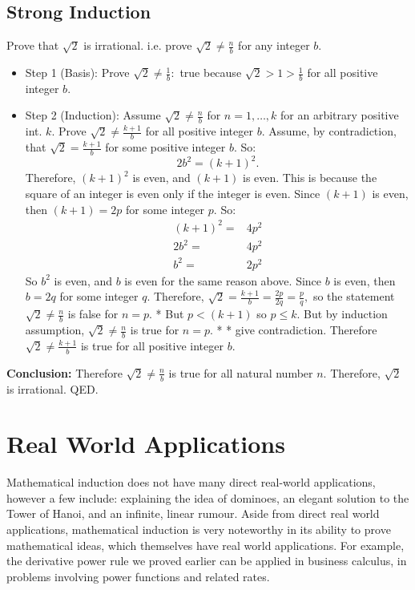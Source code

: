 \documentclass[11pt]{article}
\newtheorem*{General Definition}{General Definition}
\theoremstyle{definition}
\begin{document}
\subsection*{Strong Induction}
Prove that $\sqrt{2}$ is irrational.
i.e. prove $\sqrt{2} \neq \frac{n}{b}$ for any integer $b.$
\begin{itemize}
	\item Step 1 (Basis):
			Prove $\sqrt{2} \neq \frac{1}{b}:$ true because $\sqrt{2} >1>\frac{1}{b}$ for all positive integer $b.$
	\item Step 2 (Induction):
			Assume $\sqrt{2} \neq \frac{n}{b}$ for $n=1, \dots,k$ for an arbitrary positive int. $k.$ Prove $\sqrt{2} \neq \frac{k+1}{b}$ for all positive integer $b.$
			\newline
			Assume, by contradiction, that $\sqrt{2} = \frac{k+1}{b}$ for some positive integer $b.$ So: $$2b^2=(k+1)^2.$$ Therefore, $(k+1)^2$ is even, and $(k+1)$ is even. This is because the square of an integer is even only if the integer is even.
			Since $(k+1)$ is even, then $(k+1)=2p$ for some integer $p.$ So: 
			\begin{align*}
			   (k+1)^2= & 4p^2\\
			   2b^2 =& 4p^2\\
			   b^2= & 2p^2	
			\end{align*}
			So $b^2$ is even, and $b$ is even for the same reason above.
			Since $b$ is even, then $b=2q$ for some integer $q.$
			Therefore, $\sqrt {2} = \frac {k+1}{b}=\frac {2p}{2q}=\frac {p}{q},$ so the statement $\sqrt{2} \neq \frac{n}{b}$ is false for $n=p.$ *
			But $p<(k+1)$ so $p\leq k.$ But by induction assumption, $\sqrt{2} \neq \frac{n}{b}$ is true for $n=p.$ *
			\newline
			* give contradiction. 
			Therefore $\sqrt{2} \neq \frac{k+1}{b}$ is true for all positive integer $b.$
			\end{itemize}
			\textbf{Conclusion:} Therefore $\sqrt{2} \neq \frac{n}{b}$ is true for all natural number $n.$
			Therefore, $\sqrt{2}$ is irrational. QED.
\section*{Real World Applications}
	Mathematical induction does not have many direct real-world applications, however a few include: explaining the idea of dominoes, an elegant solution to the Tower of Hanoi, and an infinite, linear rumour. Aside from direct real world applications, mathematical induction is very noteworthy in its ability to prove mathematical ideas, which themselves have real world applications. For example, the derivative power rule we proved earlier can be applied in business calculus, in problems involving power functions and related rates.	
\end{document}

